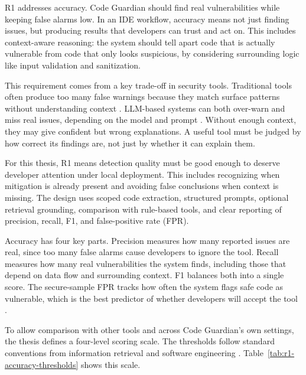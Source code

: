 \label{sec:r1-accuracy}

R1 addresses accuracy. Code Guardian should find real vulnerabilities while keeping false alarms low. In an IDE workflow, accuracy means not just finding issues, but producing results that developers can trust and act on. This includes context-aware reasoning: the system should tell apart code that is actually vulnerable from code that only looks suspicious, by considering surrounding logic like input validation and sanitization.

This requirement comes from a key trade-off in security tools. Traditional tools often produce too many false warnings because they match surface patterns without understanding context \cite{johnson2013don,chess2004staticanalysis}. LLM-based systems can both over-warn and miss real issues, depending on the model and prompt \cite{ji2023hallucination,pearce2022copilot}. Without enough context, they may give confident but wrong explanations. A useful tool must be judged by how correct its findings are, not just by whether it can explain them.

For this thesis, R1 means detection quality must be good enough to deserve developer attention under local deployment. This includes recognizing when mitigation is already present and avoiding false conclusions when context is missing. The design uses scoped code extraction, structured prompts, optional retrieval grounding, comparison with rule-based tools, and clear reporting of precision, recall, F1, and false-positive rate (FPR).

Accuracy has four key parts. Precision measures how many reported issues are real, since too many false alarms cause developers to ignore the tool. Recall measures how many real vulnerabilities the system finds, including those that depend on data flow and surrounding context. F1 balances both into a single score. The secure-sample FPR tracks how often the system flags safe code as vulnerable, which is the best predictor of whether developers will accept the tool \cite{johnson2013don}.

To allow comparison with other tools and across Code Guardian's own settings, the thesis defines a four-level scoring scale. The thresholds follow standard conventions from information retrieval and software engineering \cite{johnson2013don,ji2023hallucination}. Table~\ref{tab:r1-accuracy-thresholds} shows this scale.

